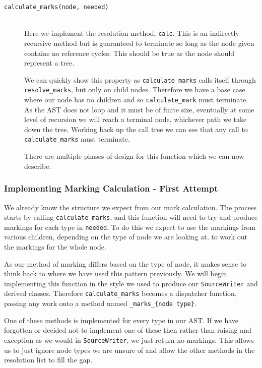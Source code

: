 \documentclass{report}
\begin{document}
\begin{description}
\item[\texttt{calculate\_marks(node, needed)}] \hfill \\
Here we implement the resolution method, \texttt{calc}. This is an indirectly recursive method but is guaranteed to terminate so long as the node
given contains no reference cycles. This should be true as the node should represent a tree.

We can quickly show this property as \texttt{calculate\_marks} calls itself through \texttt{resolve\_marks}, but only on child nodes. Therefore we have
a base case where our node has no children and so \texttt{calculate\_mark} must terminate. As the AST does not loop and it must be of finite size,
eventually at some level of recursion we will reach a terminal node, whichever path we take down the tree. Working back up the call tree we can see
that any call to \texttt{calculate\_marks} must terminate.

There are multiple phases of design for this function which we can now describe.
\end{description}

\subsubsection{Implementing Marking Calculation - First Attempt}

We already know the structure we expect from our mark calculation. The process starts by calling \texttt{calculate\_marks}, and this function will
need to try and produce markings for each type in \texttt{needed}. To do this we expect to use the markings from various children, depending on the
type of node we are looking at, to work out the markings for the whole node.

As our method of marking differs based on the type of node, it makes sense to think back to where we have used this pattern previously. We will begin
implementing this function in the style we used to produce our \texttt{SourceWriter} and derived classes. Therefore \texttt{calculate\_marks} becomes
a dispatcher function, passing any work onto a method named \texttt{\_marks\_\{node type\}}.

One of these methods is implemented for every type in our AST. If we have forgotten or decided not to implement one of these then rather than raising
and exception as we would in \texttt{SourceWriter}, we just return no markings. This allows us to just ignore node types we are unsure of and allow
the other methods in the resolution list to fill the gap.
\end{document}
